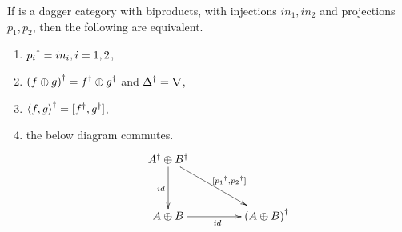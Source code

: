 \begin{lemma}\label{lemma:daggerbiproducts}
If \cD{} is a dagger category with biproducts, with injections $in_{1},in_{2}$ and projections
$p_{1},p_{2}$, then the following are equivalent.
\begin{enumerate}
  \item ${p_{i}}^{\dagger} = in_{i}, i=1,2$, \label{ldpdgrpisq}
  \item ${(f\oplus g)}^{\dagger} = {f}^{\dagger}\oplus{g}^{\dagger}$ and ${\Delta}^{\dagger} = \nabla$,\label{ldpddeltisnab}
  \item ${\langle f,g\rangle}^{\dagger} = [{f}^{\dagger},{g}^{\dagger}]$,\label{ldpdcopisprod}
  \item the below diagram commutes.\label{ldpcommute}
  \[
    \xymatrix @C+20pt @R+10pt{
      \dgr{A} \+ \dgr{B} \ar[d]_{id} \ar[dr]^{[\dgr{p_{1}},\dgr{p_{2}}]}\\
      A\+B\ar[r]_{id}&\dgr{(A\+B)}
    }
  \]
\end{enumerate}
\end{lemma}
